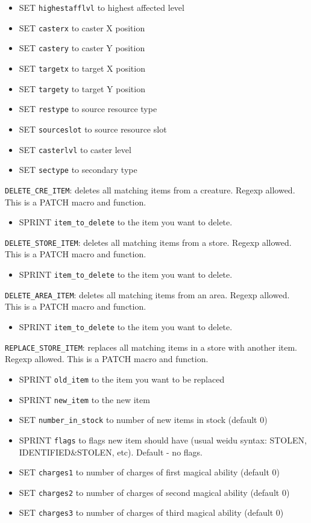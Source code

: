 \documentclass{article}
\begin{document}
\begin{itemize}
\item SET \verb+highestafflvl+ to highest affected level
\item SET \verb+casterx+ to caster X position
\item SET \verb+castery+ to caster Y position
\item SET \verb+targetx+ to target X position
\item SET \verb+targety+ to target Y position
\item SET \verb+restype+ to source resource type
\item SET \verb+sourceslot+ to source resource slot
\item SET \verb+casterlvl+ to caster level
\item SET \verb+sectype+ to secondary type
\end{itemize}

\verb+DELETE_CRE_ITEM+: deletes all matching items from a creature. Regexp allowed.
This is a PATCH macro and function.
\begin{itemize}
\item SPRINT \verb+item_to_delete+ to the item you want to delete.
\end{itemize}

\verb+DELETE_STORE_ITEM+: deletes all matching items from a store. Regexp allowed.
This is a PATCH macro and function.
\begin{itemize}
\item SPRINT \verb+item_to_delete+ to the item you want to delete.
\end{itemize}

\verb+DELETE_AREA_ITEM+: deletes all matching items from an area. Regexp allowed.
This is a PATCH macro and function.
\begin{itemize}
\item SPRINT \verb+item_to_delete+ to the item you want to delete.
\end{itemize}

\verb+REPLACE_STORE_ITEM+: replaces all matching items in a store with another item. Regexp allowed.
This is a PATCH macro and function.
\begin{itemize}
\item SPRINT \verb+old_item+ to the item you want to be replaced
\item SPRINT \verb+new_item+ to the new item
\item SET \verb+number_in_stock+ to number of new items in stock (default 0)
\item SPRINT \verb+flags+ to flags new item should have (usual weidu syntax: STOLEN, IDENTIFIED&STOLEN, etc). Default - no flags.
\item SET \verb+charges1+ to number of charges of first magical ability (default 0)
\item SET \verb+charges2+ to number of charges of second magical ability (default 0)
\item SET \verb+charges3+ to number of charges of third magical ability (default 0)
\end{itemize}
\end{document}
